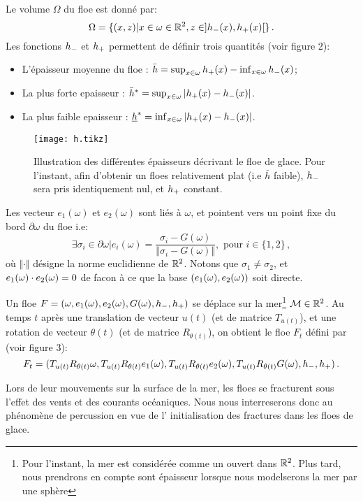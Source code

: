 Le volume $\Omega$ du floe est donné par:
\[
    \Omega = \{(x,z) | x \in \omega \in \mathbb{R}^2, z \in ]h_{-}(x), h_{+}(x)[ \} \,.
\] 
Les fonctions $h_{-}$ et $h_{+}$ permettent de définir trois quantités (voir figure 2):
\begin{itemize}
    \item L'épaisseur moyenne du floe : $\bar{h} =  \sup_{x\in\omega}{h_{+}(x)} - \inf_{x\in\omega}{h_{-}(x)}$;
    \item La plus forte epaisseur : $\bar{h}^* = \sup_{x\in\omega}{ \vert h_{+}(x) - h_{-}(x) \vert}$. 
    \item La plus faible epaisseur : $\underline{h}^* = \inf_{x\in\omega}{ \vert h_{+}(x) - h_{-}(x) \vert} $. 
\end{itemize}

\begin{figure}
    \centering
    \texttt{[image: h.tikz]}
    \caption{Illustration des différentes épaisseurs décrivant le floe de glace. Pour l'instant, afin d'obtenir un floes relativement plat (i.e $\bar{h}$ faible), $h_{-}$ sera pris identiquement nul, et $h_{+}$ constant.}
\end{figure}

Les vecteur $e_1(\omega)$ et $e_2(\omega)$ sont liés à $\omega$, et pointent vers un point fixe du bord $\partial \omega$ du floe i.e:
\[
    \exists \sigma_i \in \partial \omega | e_i(\omega) = \frac{\sigma_i - G(\omega)}{\Vert \sigma_i - G(\omega) \Vert}, \text{ pour } i \in \{1,2\} \,,
\]
où $\Vert \cdot \Vert$ désigne la norme euclidienne de $\mathbb{R}^2$. Notons que $\sigma_1 \neq \sigma_2$, et $e_1(\omega) \cdot e_2(\omega) = 0$ de facon à ce que la base $(e_1(\omega), e_2(\omega))$ soit directe.

Un floe $F = (\omega, e_1(\omega), e_2(\omega), G(\omega), h_{-}, h_{+})$ se déplace sur la mer\footnote{Pour l'instant, la mer est considérée comme un ouvert dans $\mathbb{R}^2$. Plus tard, nous prendrons en compte sont épaisseur lorsque nous modelserons la mer par une sphère} $\mathcal{M} \in \mathbb{R}^2$. Au temps $t$ après une translation de vecteur $u(t)$ (et de matrice $T_{u(t)}$), et une rotation de vecteur $\theta(t)$ (et de matrice $R_{\theta(t)}$), on obtient le floe $F_t$ défini par (voir figure 3):
\[
    F_t = (T_{u(t)}R_{\theta(t)}\omega, T_{u(t)}R_{\theta(t)}e_1(\omega), T_{u(t)}R_{\theta(t)}e_2(\omega), T_{u(t)}R_{\theta(t)}G(\omega), h_{-}, h_{+}) \,.
\]

Lors de leur mouvements sur la surface de la mer, les floes se fracturent sous l'effet des vents et des courants océaniques. Nous nous interreserons donc au phénomène de percussion en vue de l' initialisation des fractures dans les floes de glace. 


